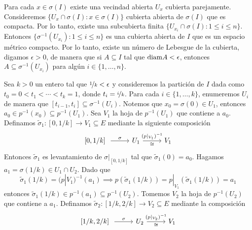 \begin{dem}
    Para cada $x\in \sigma(I)$ existe una vecindad abierta $U_x$ cubierta parejamente. Consideremos $\{U_x\cap \sigma(I):x\in\sigma(I)\}$ cubierta abierta de $\sigma(I)$ que es compacta. Por lo tanto, existe una subcubierta finita $\{U_{x_i}\cap \sigma(I):1\leq i\leq n\}$. Entonces $\{\sigma^{-1}(U_{x_i}):1\leq i\leq n\}$ es una cubierta abierta de $I$ que es un espacio métrico compacto. Por lo tanto, existe un número de Lebesgue de la cubierta, digamos $\epsilon>0$, de manera que si $A\subseteq I$ tal que $\mathrm{diam} A<\epsilon$, entonces $A\subseteq\sigma^{-1}(U_{x_i})$ para algún $i\in\{1,\ldots,n\}$.
    
    Sea $k>0$ un entero tal que $\nicefrac{1}{k}<\epsilon$ y consideremos la partición de $I$ dada como $t_0=0<t_1<\cdots<t_k=1$, donde $t_i=\nicefrac{i}{k}$. Para cada $i\in\{1,\ldots,k\}$, enumeremos $U_i$ de manera que $ [t_{i-1},t_i]\subseteq\sigma^{-1}(U_i)$. Notemos que $x_0=\sigma(0)\in U_1$, entonces $a_0\in p^{-1}(x_0)\subseteq p^{-1}(U_1)$. Sea $V_1$ la hoja de $p^{-1}(U_1)$ que contiene a $a_0$. Definamos $\widetilde{\sigma}_1:[0,1/k]\to V_1\subseteq E$ mediante la siguiente composición
    \begin{equation*}
        \begin{tikzcd}[column sep=0.95cm]
            \text{[}0, 1/k\text{]
            } \arrow[r,"\sigma"] & U_1\arrow[r,"(p\hspace{0.1mm}|_{V_1})^{-1}","\cong"'] & V_1
        \end{tikzcd}
    \end{equation*}
    Entonces $\widetilde{\sigma}_1$ es levantamiento de $\sigma|_{[0,1/k]}$ tal que $\widetilde{\sigma}_1(0)=a_0$. Hagamos $a_1=\sigma(1/k)\in U_1\cap U_2$. Dado que
    \begin{equation*}
        \widetilde{\sigma}_1(1/k)=(p|V_1)^{-1}(a_1)\implies p(\widetilde{\sigma}_1(1/k))=p|_{V_1}(\widetilde{\sigma}_1(1/k))=a_1
    \end{equation*}
    entonces $\widetilde{\sigma}_1(1/k)\in p^{-1}(a_1)\subseteq p^{-1}(U_2)$. Tomemos $V_2$ la hoja de $p^{-1}(U_2)$ que contiene a $a_1$. Definamos $\widetilde{\sigma}_2:[1/k,2/k]\to V_2\subseteq E$ mediante la composición 
     \begin{equation*}
        \begin{tikzcd}[column sep=0.95cm]
            \text{[} 1/k,2/k\text{]
            } \arrow[r,"\sigma"] & U_2\arrow[r,"(p\hspace{0.1mm}|_{V_2})^{-1}","\cong"'] & V_1

\end{tikzcd}
\end{equation*}
\end{dem}

